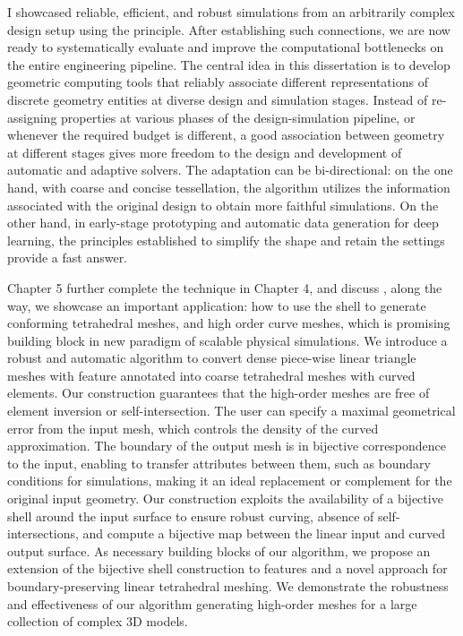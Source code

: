 I showcased reliable, efficient, and robust simulations from an arbitrarily complex design setup using the principle. After establishing such connections, we are now ready to systematically evaluate and improve the computational bottlenecks on the entire engineering pipeline.
The central idea in this dissertation is to develop geometric computing tools that reliably associate different representations of discrete geometry entities at diverse design and simulation stages. Instead of re-assigning properties at various phases of the design-simulation pipeline, or whenever the required budget is different, a good association between geometry at different stages gives more freedom to the design and development of automatic and adaptive solvers. The adaptation can be bi-directional: on the one hand, with coarse and concise tessellation, the algorithm utilizes the information associated with the original design to obtain more faithful simulations. On the other hand, in early-stage prototyping and automatic data generation for deep learning, the principles established to simplify the shape and retain the settings provide a fast answer. 

Chapter 5 further complete the technique in Chapter 4, and discuss , along the way, we showcase an important application: how to use the shell to generate conforming tetrahedral meshes, and high order curve meshes, which is promising building block in new paradigm of scalable physical simulations. 
We introduce a robust and automatic algorithm to convert dense piece-wise linear triangle meshes with feature annotated into coarse tetrahedral meshes with curved elements. 
Our construction guarantees that the high-order meshes are free of element inversion or self-intersection. 
The user can specify a maximal geometrical error from the input mesh, which  controls the density of the curved approximation. The boundary of the output mesh is in bijective correspondence to the input, enabling to transfer attributes between them, such as boundary conditions for simulations, making it an ideal replacement or complement for the original input geometry. 
Our construction exploits the availability of a bijective shell around the input surface to ensure robust curving, absence of self-intersections, and compute a bijective map between the linear input and curved output surface. As necessary building blocks of our algorithm, we propose an extension of the bijective shell construction to features and a novel approach for boundary-preserving linear tetrahedral meshing.
We demonstrate the robustness and effectiveness of our algorithm generating high-order meshes for a large collection of complex 3D models.

